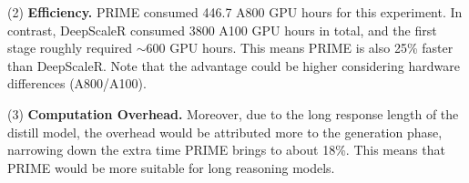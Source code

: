 (2) \textbf{Efficiency.} PRIME consumed 446.7 A800 GPU hours for this experiment. In contrast, DeepScaleR consumed 3800 A100 GPU hours in total, and the first stage roughly required $\sim$600 GPU hours. This means PRIME is also 25\% faster than DeepScaleR. Note that the advantage could be higher considering hardware differences (A800/A100).

(3) \textbf{Computation Overhead.} Moreover, due to the long response length of the distill model, the overhead would be attributed more to the generation phase, narrowing down the extra time PRIME brings to about 18\%. This means that PRIME would be more suitable for long reasoning models.



% 





% 
% 

